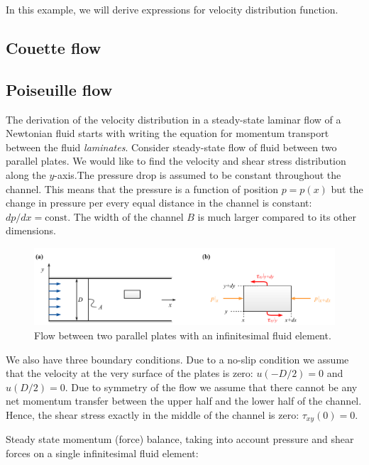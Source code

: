 In this example, we will derive expressions for velocity distribution function. 

\subsection{Couette flow}

\subsection{Poiseuille flow}

The derivation of the velocity distribution in a steady-state laminar flow of a Newtonian fluid starts with writing the equation for momentum transport between the fluid \textit{laminates}.
Consider steady-state flow of fluid between two parallel plates. We would like to find the velocity and shear stress distribution along the $y$-axis.The pressure drop is assumed to be constant throughout the channel. This means that the pressure is a function of position $p = p(x)$ but the change in pressure per every equal distance in the channel is constant: $dp/dx = \text{const}$. The width of the channel $B$ is much larger compared to its other dimensions.

\begin{figure}[H]
\centering\includegraphics[width=15cm]{figures/poiseuille-flow.pdf}
\caption{Flow between two parallel plates with an infinitesimal fluid element.}			
\label{fig:poiseuille-fluid-element}
\end{figure}

We also have three boundary conditions. Due to a no-slip condition we assume that the velocity at the very surface of the plates is zero: $u(-D/2) = 0$ and $u(D/2) = 0$. Due to symmetry of the flow we assume that there cannot be any net momentum transfer between the upper half and the lower half of the channel. Hence, the shear stress exactly in the middle of the channel is zero: $\tau_{xy}(0) = 0$.

Steady state momentum (force) balance, taking into account pressure and shear forces on a single infinitesimal fluid element:

